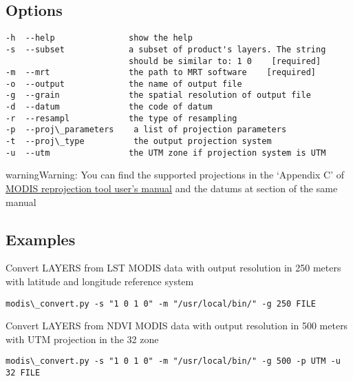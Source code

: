\documentclass[a4paper,11pt,oneside]{sphinxmanual}
\begin{document}
\subsection{Options}
\label{scripts/modis_convert:options}
\begin{Verbatim}[commandchars=\\\{\}]
-h  --help               show the help
-s  --subset             a subset of product's layers. The string
                         should be similar to: 1 0    [required]
-m  --mrt                the path to MRT software    [required]
-o  --output             the name of output file
-g  --grain              the spatial resolution of output file
-d  --datum              the code of datum
-r  --resampl            the type of resampling
-p  --proj\_parameters    a list of projection parameters
-t  --proj\_type          the output projection system
-u  --utm                the UTM zone if projection system is UTM
\end{Verbatim}

\begin{notice}{warning}{Warning:}
You can find the supported projections in the `Appendix C' of
\href{https://lpdaac.usgs.gov/sites/default/files/public/mrt41\_usermanual\_032811.pdf}{MODIS reprojection tool user's manual} and the datums at section
 of the same manual
\end{notice}


\subsection{Examples}
\label{scripts/modis_convert:examples}
Convert LAYERS from LST MODIS data with output resolution in 250 meters with
latitude and longitude reference system

\begin{Verbatim}[commandchars=\\\{\}]
modis\_convert.py -s "1 0 1 0" -m "/usr/local/bin/" -g 250 FILE
\end{Verbatim}

Convert LAYERS from NDVI MODIS data with output resolution in 500 meters with
UTM projection in the 32  zone

\begin{Verbatim}[commandchars=\\\{\}]
modis\_convert.py -s "1 0 1 0" -m "/usr/local/bin/" -g 500 -p UTM -u 32 FILE
\end{Verbatim}
\newpage %
\end{document}
